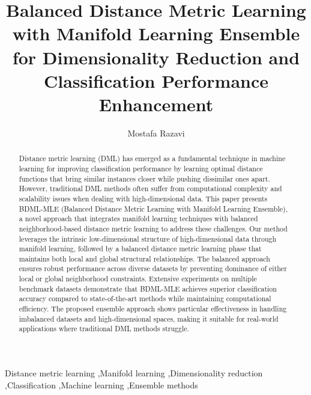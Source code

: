 \documentclass[review]{elsarticle}
\begin{document}
\begin{frontmatter}

\title{Balanced Distance Metric Learning with Manifold Learning Ensemble for Dimensionality Reduction and Classification Performance Enhancement}

\author[rvt]{Mostafa Razavi}

\address[rvt]{Department of Computer Science, University Example, Country}

\begin{abstract}
Distance metric learning (DML) has emerged as a fundamental technique in machine learning for improving classification performance by learning optimal distance functions that bring similar instances closer while pushing dissimilar ones apart. However, traditional DML methods often suffer from computational complexity and scalability issues when dealing with high-dimensional data. This paper presents BDML-MLE (Balanced Distance Metric Learning with Manifold Learning Ensemble), a novel approach that integrates manifold learning techniques with balanced neighborhood-based distance metric learning to address these challenges. Our method leverages the intrinsic low-dimensional structure of high-dimensional data through manifold learning, followed by a balanced distance metric learning phase that maintains both local and global structural relationships. The balanced approach ensures robust performance across diverse datasets by preventing dominance of either local or global neighborhood constraints. Extensive experiments on multiple benchmark datasets demonstrate that BDML-MLE achieves superior classification accuracy compared to state-of-the-art methods while maintaining computational efficiency. The proposed ensemble approach shows particular effectiveness in handling imbalanced datasets and high-dimensional spaces, making it suitable for real-world applications where traditional DML methods struggle.
\end{abstract}

\begin{keyword}
Distance metric learning \sep Manifold learning \sep Dimensionality reduction \sep Classification \sep Machine learning \sep Ensemble methods
\end{keyword}

\end{frontmatter}

\linenumbers
\end{document}
